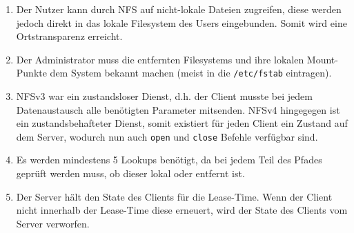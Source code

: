 \documentclass[german,12pt,a4paper]{article}
\begin{document}
\begin{enumerate}

	\item Der Nutzer kann durch NFS auf nicht-lokale Dateien zugreifen, diese werden jedoch direkt in
		das lokale Filesystem des Users eingebunden. Somit wird eine Ortstransparenz erreicht.
	
	\item Der Administrator muss die entfernten Filesystems und ihre lokalen Mount-Punkte dem System
		bekannt machen (meist in die \texttt{/etc/fstab} eintragen).
	
	\item NFSv3 war ein zustandsloser Dienst, d.h. der Client musste bei jedem Datenaustausch alle
		benötigten Parameter mitsenden. NFSv4 hingegegen ist ein zustandsbehafteter Dienst, somit
		existiert für jeden Client ein Zustand auf dem Server, wodurch nun auch \texttt{open} und
		\texttt{close} Befehle verfügbar sind.
	
	\item Es werden mindestens 5 Lookups benötigt, da bei jedem Teil des Pfades geprüft werden 
		muss, ob dieser lokal oder entfernt ist.
	
	\item Der Server hält den State des Clients für die Lease-Time. Wenn der Client nicht innerhalb
		der Lease-Time diese erneuert, wird der State des Clients vom Server verworfen.

\end{enumerate}
\end{document}
